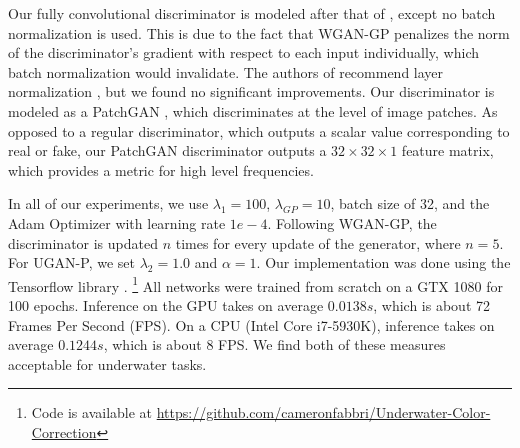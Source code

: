 Our fully convolutional discriminator is modeled after that of \cite{radford2015unsupervised}, except no batch
normalization is used. This is due to the fact that WGAN-GP penalizes the norm of the discriminator's gradient with
respect to each input individually, which batch normalization would invalidate. The authors of
\cite{gulrajani2017improved} recommend layer normalization \cite{ba2016layer}, but we found no significant improvements.
Our discriminator is modeled as a PatchGAN \cite{isola2016image,li2016precomputed}, which discriminates at the level of
image patches. As opposed to a regular discriminator, which outputs a scalar value corresponding to real or fake, our
PatchGAN discriminator outputs a $32 \times 32 \times 1$ feature matrix, which provides a metric for high level
frequencies. %

In all of our experiments, we use $\lambda_{1} = 100$, $\lambda_{GP} = 10$, batch size of 32, and the Adam Optimizer
\cite{kingma2014adam} with learning rate $1e-4$. Following WGAN-GP, the discriminator is updated $n$ times for every
update of the generator, where $n = 5$. For UGAN-P, we set $\lambda_{2} = 1.0$ and $\alpha = 1$. Our implementation was done using 
the
Tensorflow library \cite{abadi2016tensorflow}.
\footnote{Code is available at \url{https://github.com/cameronfabbri/Underwater-Color-Correction}}
All networks were trained from scratch on a GTX 1080 for 100 epochs. Inference on the GPU takes on average $ 0.0138s$,
which is about 72 Frames Per Second (FPS). On a CPU (Intel Core i7-5930K), inference takes on average $ 0.1244s$, which
is about 8 FPS. We find both of these measures acceptable for underwater tasks.